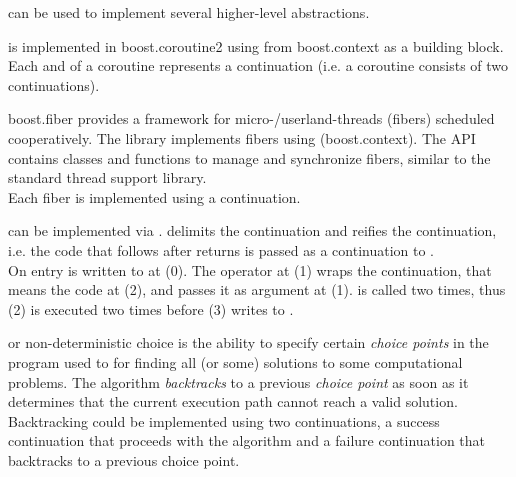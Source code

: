 \newpage
{}

\cc can be used to implement several higher-level abstractions.



is implemented in boost.coroutine2\cite{bcoroutine2} using \cc from
boost.context\cite{bcontext} as a building block. Each  and
 of a coroutine represents a continuation (i.e. a coroutine
consists of two continuations).



boost.fiber\cite{bfiber} provides a framework for micro-/userland-threads
(fibers) scheduled cooperatively. The library implements fibers using \cc
(boost.context\cite{bcontext}). The API contains classes and functions to manage
and synchronize fibers, similar to the standard thread support library.\\
Each fiber is implemented using a continuation.


\label{delimited}

can be implemented via \cc.  delimits the continuation and
 reifies the continuation, i.e. the code that follows after
 returns is passed as a continuation to .\\

On entry  is written to  at (0). The  operator
at (1) wraps the continuation, that means the code at (2), and passes it as
argument  at (1).  is called two times, thus (2) is
executed two times before (3) writes  to .



or non-deterministic choice is the ability to specify certain
\emph{choice points} in the program used to for finding all (or some) solutions
to some computational problems. The algorithm \emph{backtracks} to a previous
\emph{choice point} as soon as it determines that the current execution path cannot
reach a valid solution.\\
Backtracking could be implemented using two continuations, a success
continuation that proceeds with the algorithm and a failure continuation that
backtracks to a previous choice point\cite{Ferguson}.

